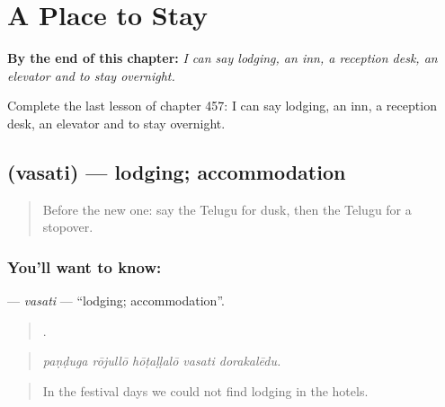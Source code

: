 
\chapter{A Place to Stay}
\label{ch:te-a-place-to-stay}

\begin{chapteropening}
\textbf{By the end of this chapter:} \emph{I can say lodging, an inn, a reception desk, an elevator and to stay overnight.}

Complete the last lesson of chapter 457: I can say lodging, an inn, a reception desk, an elevator and to stay overnight.
\end{chapteropening}

\section[\texorpdfstring{\te{వసతి} (vasati)}{వసతి (vasati)}]{ (vasati) — lodging; accommodation}

\label{lesson:TE-C457-vasati}



\begin{quote}
Before the new one: say the Telugu for dusk, then the Telugu for a stopover.
\end{quote}

\subsection*{You'll want to know: }
\textbf{} — \emph{vasati} — \textquotedblleft{}lodging; accommodation\textquotedblright{}.

\begin{quote}
    .
\end{quote}

\begin{quote}
\emph{paṇḍuga rōjullō hōṭaḷḷalō vasati dorakalēdu.}
\end{quote}

\begin{quote}
In the festival days we could not find lodging in the hotels.
\end{quote}


